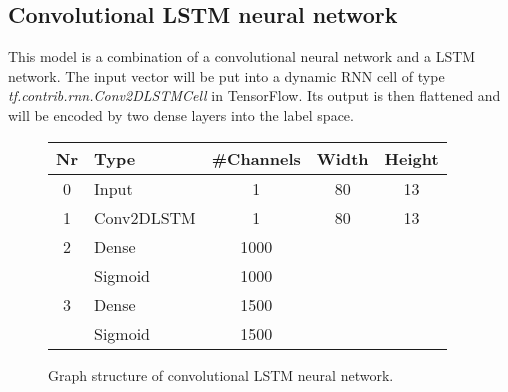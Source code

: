\subsection*{Convolutional LSTM neural network}
This model is a combination of a convolutional neural network and a LSTM network. The input vector will be put into a dynamic RNN cell of type \newline\textit{tf.contrib.rnn.Conv2DLSTMCell} in TensorFlow. Its output is then flattened and will be encoded by two dense layers into the label space.
\begin{figure}[h]
	\centering
	\begin{tabular}{clccc}
		\hline \textbf{Nr} & \textbf{Type} & \textbf{\#Channels} & \textbf{Width} & \textbf{Height} \\ \hline
		0 & Input & 1 & 80 & 13 \\
		1 & Conv2DLSTM & 1 & 80 & 13 \\
		2 & Dense & 1000 & & \\
		& Sigmoid & 1000 & & \\
		3 & Dense & 1500 & & \\
		& Sigmoid & 1500 & & \\ \hline
	\end{tabular}
	\caption[Convolutional LSTM structure]{Graph structure of convolutional LSTM neural network.}
\end{figure}
\FloatBarrier
